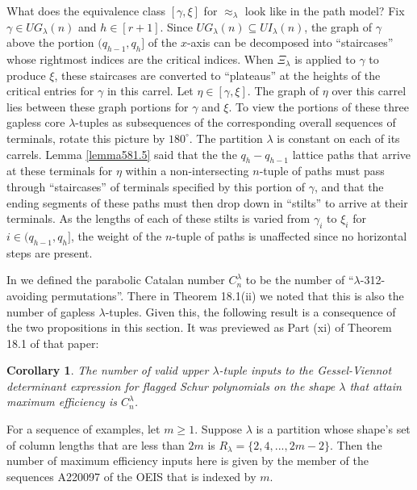 \documentclass[11pt]{article}
\newtheorem{cor}[thm]{Corollary}
\theoremstyle{definition}
\theoremstyle{remark}
\numberwithin{equation}{section}
\begin{document}
\begin{spacing}{1.35}
What does the equivalence class $[\gamma, \xi]$ for $\approx_\lambda$ look like in the path model?  Fix $\gamma \in UG_\lambda(n)$ and $h \in [r+1]$.  Since $UG_\lambda(n) \subseteq UI_\lambda(n)$, the graph of $\gamma$ above the portion $(q_{h-1}, q_h]$ of the $x$-axis can be decomposed into ``staircases'' whose rightmost indices are the critical indices.  When $\Xi_\lambda$ is applied to $\gamma$ to produce $\xi$, these staircases are converted to ``plateaus'' at the heights of the critical entries for $\gamma$ in this carrel.  Let $\eta \in [\gamma, \xi]$.  The graph of $\eta$ over this carrel lies between these graph portions for $\gamma$ and $\xi$.  To view the portions of these three gapless core $\lambda$-tuples as subsequences of the corresponding overall sequences of terminals, rotate this picture by $180^\circ$.  The partition $\lambda$ is constant on each of its carrels.  Lemma \ref{lemma581.5} said that the the $q_h - q_{h-1}$ lattice paths that arrive at these terminals for $\eta$ within a non-intersecting $n$-tuple of paths must pass through ``staircases'' of terminals specified by this portion of $\gamma$, and that the ending segments of these paths must then drop down in ``stilts'' to arrive at their terminals.  As the lengths of each of these stilts is varied from $\gamma_i$ to $\xi_i$ for $i \in (q_{h-1}, q_h]$, the weight of the $n$-tuple of paths is unaffected since no horizontal steps are present.



In \cite{PW} we defined the parabolic Catalan number $C_n^\lambda$ to be the number of ``$\lambda$-312-avoiding permutations''.  There in Theorem 18.1(ii) we noted that this is also the number of gapless $\lambda$-tuples.  Given this, the following result is a consequence of the two propositions in this section.  It was previewed as Part (xi) of Theorem 18.1 of that paper:

\begin{cor}\label{cor826.12}The number of valid upper $\lambda$-tuple inputs to the Gessel-Viennot determinant expression for flagged Schur polynomials on the shape $\lambda$ that attain maximum efficiency is $C_n^\lambda$.  \end{cor}

\noindent For a sequence of examples, let $m \geq 1$.  Suppose $\lambda$ is a partition whose shape's set of column lengths that are less than $2m$ is $R_\lambda = \{ 2, 4, ... , 2m-2 \}$.  Then the number of maximum efficiency inputs here is given by the member of the sequences A220097 of the OEIS \cite{Slo} that is indexed by $m$.











\end{spacing}
\end{document}
